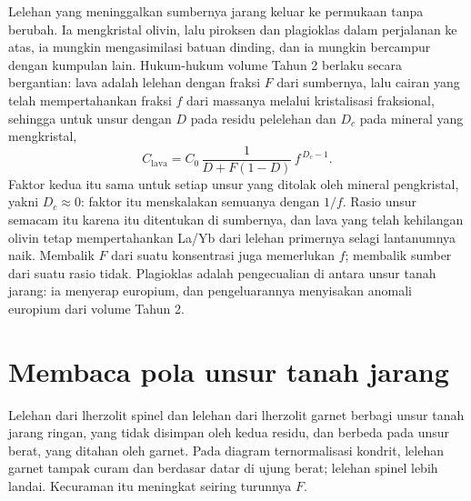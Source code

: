 Lelehan yang meninggalkan sumbernya jarang keluar ke permukaan tanpa berubah. Ia mengkristal
olivin, lalu piroksen dan plagioklas dalam perjalanan ke atas, ia mungkin mengasimilasi batuan
dinding, dan ia mungkin bercampur dengan kumpulan lain. Hukum-hukum volume Tahun 2 berlaku
secara bergantian: lava adalah lelehan dengan fraksi $F$ dari sumbernya, lalu cairan yang
telah mempertahankan fraksi $f$ dari massanya melalui kristalisasi fraksional, sehingga
untuk unsur dengan $D$ pada residu pelelehan dan $D_c$ pada
mineral yang mengkristal,
\[
C_{\text{lava}} = C_0\,\frac{1}{D + F(1 - D)}\,f^{\,D_c - 1}.
\]
Faktor kedua itu sama untuk setiap unsur yang ditolak oleh mineral
pengkristal, yakni $D_c \approx 0$: faktor itu menskalakan semuanya dengan $1/f$. Rasio
unsur semacam itu karena itu ditentukan di sumbernya, dan lava yang telah kehilangan olivin
tetap mempertahankan La/Yb dari lelehan primernya selagi lantanumnya naik. Membalik $F$
dari suatu konsentrasi juga memerlukan $f$; membalik sumber dari suatu rasio
tidak. Plagioklas adalah pengecualian di antara unsur tanah jarang: ia menyerap europium,
dan pengeluarannya menyisakan anomali europium dari volume Tahun 2.

\section{Membaca pola unsur tanah jarang}\label{sec:b3:trace-element-modelling:patterns}

Lelehan dari lherzolit spinel dan lelehan dari lherzolit garnet berbagi unsur tanah jarang ringan,
yang tidak disimpan oleh kedua residu, dan berbeda pada unsur berat, yang ditahan oleh garnet.
Pada diagram ternormalisasi kondrit, lelehan garnet tampak
curam dan berdasar datar di ujung berat; lelehan spinel lebih landai. Kecuraman
itu meningkat seiring turunnya $F$.

